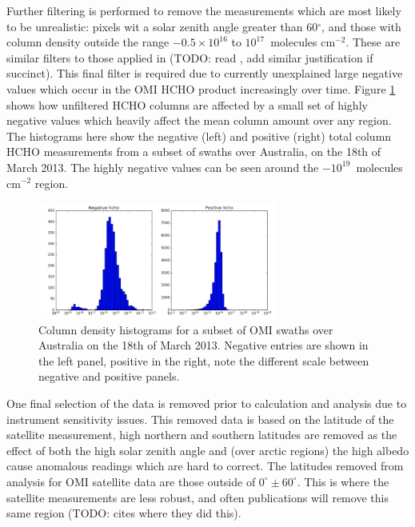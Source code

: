     Further filtering is performed to remove the measurements which are most likely to be unrealistic: pixels wit a solar zenith angle greater than 60$^\circ$, and those with column density outside the range $-0.5 \times 10^{16}$ to $10^{17} $~molecules cm$^{-2}$.
    These are similar filters to those applied in (TODO: read \citet{Zhu2016}, add similar justification if succinct).
    This final filter is required due to currently unexplained large negative values which occur in the OMI HCHO product increasingly over time.
    Figure \ref{ch_HCHO:fig:OMI_negative_hist} shows how unfiltered HCHO columns are affected by a small set of highly negative values which heavily affect the mean column amount over any region.
    The histograms here show the negative (left) and positive (right) total column HCHO measurements from a subset of swaths over Australia, on the 18th of March 2013.
    The highly negative values can be seen around the $-10^{19}$~molecules cm$^{-2}$ region.
    
    \begin{figure}[!htbp]\begin{center}
      \includegraphics[width=0.7\textwidth]{Figures/AusOMHCHO_Hist_20130318.png}
      \caption{Column density histograms for a subset of OMI swaths over Australia on the 18th of March 2013.
      Negative entries are shown in the left panel, positive in the right, note the different scale between negative and positive panels.}
      \label{ch_HCHO:fig:OMI_negative_hist}
    \end{center}\end{figure}
    
    One final selection of the data is removed prior to calculation and analysis due to instrument sensitivity issues.
    This removed data is based on the latitude of the satellite measurement, high northern and southern latitudes are removed as the effect of both the high solar zenith angle and (over arctic regions) the high albedo cause anomalous readings which are hard to correct.
    The latitudes removed from analysis for OMI satellite data are those outside of $0^\circ \pm 60^\circ$. 
    This is where the satellite measurements are less robust, and often publications will remove this same region (TODO: cites where they did this).
  
